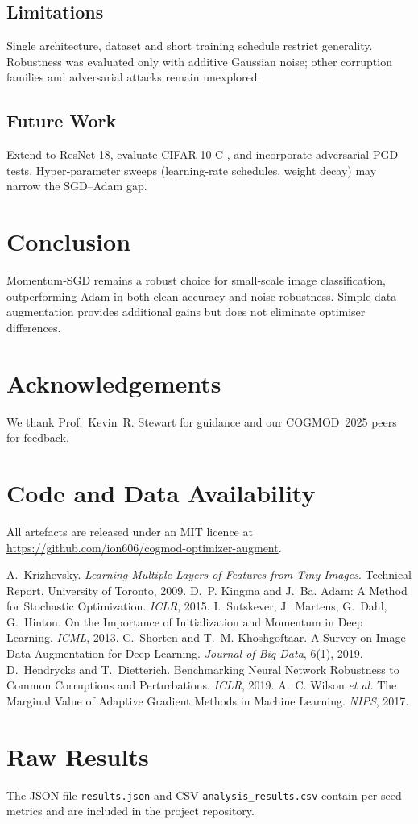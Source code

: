 \documentclass{article}
\begin{document}
\subsection{Limitations}
Single architecture, dataset and short training schedule restrict generality. Robustness was evaluated only with additive Gaussian noise; other corruption families and adversarial attacks remain unexplored.

\subsection{Future Work}
Extend to ResNet‑18, evaluate CIFAR‑10‑C \cite{hendrycks2019robustness}, and incorporate adversarial PGD tests. Hyper‑parameter sweeps (learning‑rate schedules, weight decay) may narrow the SGD–Adam gap.

\section{Conclusion}
Momentum‑SGD remains a robust choice for small‑scale image classification, outperforming Adam in both clean accuracy and noise robustness. Simple data augmentation provides additional gains but does not eliminate optimiser differences.

\section*{Acknowledgements}
We thank Prof.~Kevin R. Stewart for guidance and our COGMOD~2025 peers for feedback.

\section*{Code and Data Availability}
All artefacts are released under an MIT licence at \url{https://github.com/ion606/cogmod-optimizer-augment}.

\begin{thebibliography}{9}
 A.~Krizhevsky. \textit{Learning Multiple Layers of Features from Tiny Images}. Technical Report, University of Toronto, 2009.
 D.~P. Kingma and J.~Ba. Adam: A Method for Stochastic Optimization. \textit{ICLR}, 2015.
 I.~Sutskever, J.~Martens, G.~Dahl, G.~Hinton. On the Importance of Initialization and Momentum in Deep Learning. \textit{ICML}, 2013.
 C.~Shorten and T.~M. Khoshgoftaar. A Survey on Image Data Augmentation for Deep Learning. \textit{Journal of Big Data}, 6(1), 2019.
 D.~Hendrycks and T.~Dietterich. Benchmarking Neural Network Robustness to Common Corruptions and Perturbations. \textit{ICLR}, 2019.
 A.~C. Wilson \textit{et al.} The Marginal Value of Adaptive Gradient Methods in Machine Learning. \textit{NIPS}, 2017.
\end{thebibliography}

\appendix
\section{Raw Results}
The JSON file \texttt{results.json} and CSV \texttt{analysis\_results.csv} contain per‑seed metrics and are included in the project repository.
\end{document}
